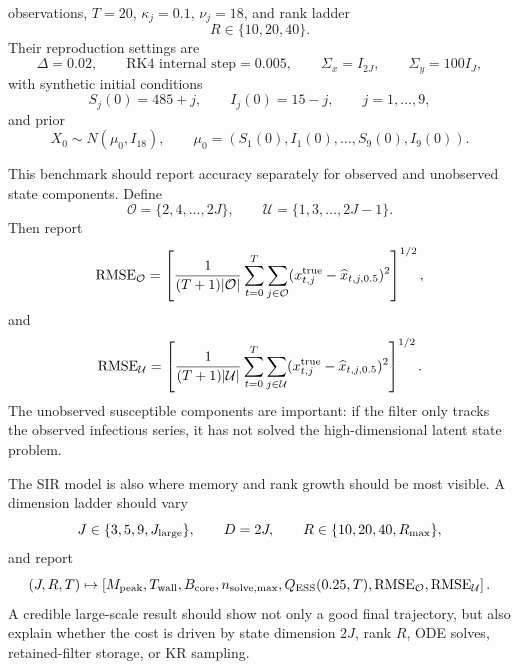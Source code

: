 \documentclass[11pt]{article}
\numberwithin{equation}{section}
\begin{document}
observations, \(T=20\), \(\kappa_j=0.1\), \(\nu_j=18\), and rank ladder
\begin{equation}
    R\in\{10,20,40\}.
    \label{eq:p27-sir8}
\end{equation}
Their reproduction settings are
\begin{equation}
    \Delta=0.02,
    \qquad
    \text{RK4 internal step}=0.005,
    \qquad
    \Sigma_x=I_{2J},
    \qquad
    \Sigma_y=100I_J,
    \label{eq:p27-sir8a}
\end{equation}
with synthetic initial conditions
\begin{equation}
    S_j(0)=485+j,
    \qquad
    I_j(0)=15-j,
    \qquad
    j=1,\ldots,9,
    \label{eq:p27-sir8b}
\end{equation}
and prior
\begin{equation}
    X_0\sim N(\mu_0,I_{18}),
    \qquad
    \mu_0=(S_1(0),I_1(0),\ldots,S_9(0),I_9(0)).
    \label{eq:p27-sir8c}
\end{equation}

This benchmark should report accuracy separately for observed and unobserved
state components.  Define
\begin{equation}
    \mathcal O=\{2,4,\ldots,2J\},
    \qquad
    \mathcal U=\{1,3,\ldots,2J-1\}.
    \label{eq:p27-sir9}
\end{equation}
Then report
\begin{equation}
    {\rm RMSE}_{\mathcal O}
    =
    \left[
    \frac1{(T+1)|\mathcal O|}
    \sum_{t=0}^T
    \sum_{j\in\mathcal O}
    (x_{t,j}^{\rm true}-\widehat x_{t,j,0.5})^2
    \right]^{1/2},
    \label{eq:p27-sir10}
\end{equation}
and
\begin{equation}
    {\rm RMSE}_{\mathcal U}
    =
    \left[
    \frac1{(T+1)|\mathcal U|}
    \sum_{t=0}^T
    \sum_{j\in\mathcal U}
    (x_{t,j}^{\rm true}-\widehat x_{t,j,0.5})^2
    \right]^{1/2}.
    \label{eq:p27-sir11}
\end{equation}
The unobserved susceptible components are important: if the filter only tracks
the observed infectious series, it has not solved the high-dimensional latent
state problem.

The SIR model is also where memory and rank growth should be most visible.  A
dimension ladder should vary
\begin{equation}
    J\in\{3,5,9,J_{\rm large}\},
    \qquad
    D=2J,
    \qquad
    R\in\{10,20,40,R_{\rm max}\},
    \label{eq:p27-sir12}
\end{equation}
and report
\begin{equation}
    (J,R,T)
    \mapsto
    \left[
    M_{\rm peak},
    T_{\rm wall},
    B_{\rm core},
    n_{\rm solve,max},
    Q_{\rm ESS}(0.25,T),
    {\rm RMSE}_{\mathcal O},
    {\rm RMSE}_{\mathcal U}
    \right].
    \label{eq:p27-sir13}
\end{equation}
A credible large-scale result should show not only a good final trajectory, but
also explain whether the cost is driven by state dimension \(2J\), rank \(R\),
ODE solves, retained-filter storage, or KR sampling.
\end{document}
